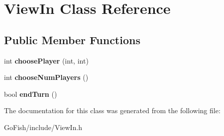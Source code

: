 \hypertarget{class_view_in}{\section{View\-In Class Reference}
\label{class_view_in}
}
\subsection*{Public Member Functions}
\begin{DoxyCompactItemize}
\item 
\hypertarget{class_view_in_ab300d2831c402f1eff4039fbf915a6b6}{int {\bfseries choose\-Player} (int, int)}\label{class_view_in_ab300d2831c402f1eff4039fbf915a6b6}

\item 
\hypertarget{class_view_in_a81408b8c0292c5680da91c75525c8d3b}{int {\bfseries choose\-Num\-Players} ()}\label{class_view_in_a81408b8c0292c5680da91c75525c8d3b}

\item 
\hypertarget{class_view_in_a4c5430a20d6f69b989443a0bc2b94593}{bool {\bfseries end\-Turn} ()}\label{class_view_in_a4c5430a20d6f69b989443a0bc2b94593}

\end{DoxyCompactItemize}


The documentation for this class was generated from the following file\-:\begin{DoxyCompactItemize}
\item 
Go\-Fish/include/View\-In.\-h\end{DoxyCompactItemize}
